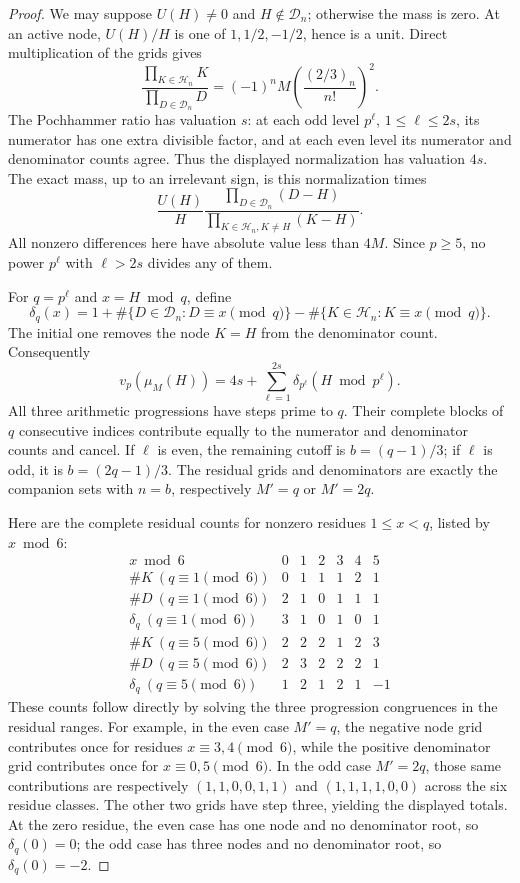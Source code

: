 \documentclass[11pt,letterpaper]{article}
\numberwithin{equation}{section}
\begin{document}
\begin{proof}
We may suppose $U(H)\ne0$ and $H\notin\mathcal D_n$; otherwise the
mass is zero. At an active node, $U(H)/H$ is one of
$1,1/2,-1/2$, hence is a unit. Direct multiplication of the grids gives
\[
 \frac{\prod_{K\in\mathcal H_n}K}{\prod_{D\in\mathcal D_n}D}
 =(-1)^nM\left(\frac{(2/3)_n}{n!}\right)^2.
\]
The Pochhammer ratio has valuation $s$: at each odd level
$p^\ell$, $1\le\ell\le2s$, its numerator has one extra divisible
factor, and at each even level its numerator and denominator counts
agree. Thus the displayed normalization has valuation $4s$.
The exact mass, up to an irrelevant sign, is this normalization times
\[
 \frac{U(H)}H
 \frac{\prod_{D\in\mathcal D_n}(D-H)}
 {\prod_{K\in\mathcal H_n,K\ne H}(K-H)}.
\]
All nonzero differences here have absolute value less than $4M$.
Since $p\ge5$, no power $p^\ell$ with $\ell>2s$ divides any of them.

For $q=p^\ell$ and $x=H\bmod q$, define
\[
 \delta_q(x)=1+\#\{D\in\mathcal D_n:D\equiv x\pmod q\}
 -\#\{K\in\mathcal H_n:K\equiv x\pmod q\}.
\]
The initial one removes the node $K=H$ from the denominator count.
Consequently
\begin{equation}\label{VIII-E7:mass-count}
 v_p(\mu_M(H))=4s+\sum_{\ell=1}^{2s}\delta_{p^\ell}(H\bmod p^\ell).
\end{equation}
All three arithmetic progressions have steps prime to $q$.
Their complete blocks of $q$ consecutive indices contribute equally
to the numerator and denominator counts and cancel. If $\ell$ is
even, the remaining cutoff is $b=(q-1)/3$; if $\ell$ is odd,
it is $b=(2q-1)/3$. The residual grids and denominators are exactly
the companion sets with $n=b$, respectively $M'=q$ or $M'=2q$.

Here are the complete residual counts for nonzero residues
$1\le x<q$, listed by $x\bmod6$:
\[
\begin{array}{c|rrrrrr}
x\bmod6&0&1&2&3&4&5\\\hline
\#K\ (q\equiv1\pmod6)&0&1&1&1&2&1\\
\#D\ (q\equiv1\pmod6)&2&1&0&1&1&1\\
\delta_q\ (q\equiv1\pmod6)&3&1&0&1&0&1\\\hline
\#K\ (q\equiv5\pmod6)&2&2&2&1&2&3\\
\#D\ (q\equiv5\pmod6)&2&3&2&2&2&1\\
\delta_q\ (q\equiv5\pmod6)&1&2&1&2&1&-1
\end{array}
\]
These counts follow directly by solving the three progression
congruences in the residual ranges. For example, in the even case
$M'=q$, the negative node grid contributes once for residues
$x\equiv3,4\pmod6$, while the positive denominator grid contributes
once for $x\equiv0,5\pmod6$. In the odd case $M'=2q$, those same
contributions are respectively $(1,1,0,0,1,1)$ and
$(1,1,1,1,0,0)$ across the six residue classes. The other two grids
have step three, yielding the displayed totals.
At the zero residue, the even case has one node and no denominator
root, so $\delta_q(0)=0$; the odd case has three nodes and no
denominator root, so $\delta_q(0)=-2$.


\end{proof}
\end{document}
